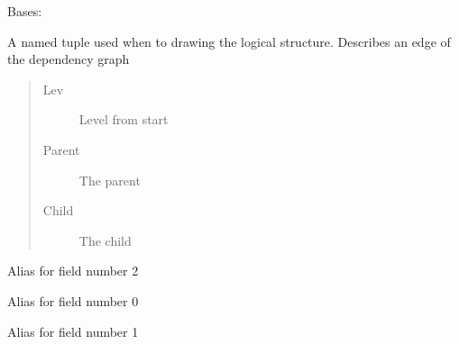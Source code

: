 \documentclass[letterpaper,10pt,english]{sphinxmanual}
\begin{document}
\begin{fulllineitems}
\label{\detokenize{core/modelclass:modelclass.node}}
\pysigstartsignatures
{}
\pysigstopsignatures
\sphinxAtStartPar
Bases: 

\sphinxAtStartPar
A named tuple used when to drawing the logical structure. Describes an edge of the dependency graph
\begin{quote}\begin{description}
\item[{Lev}] \leavevmode
\sphinxAtStartPar
Level from start

\item[{Parent}] \leavevmode
\sphinxAtStartPar
The parent

\item[{Child}] \leavevmode
\sphinxAtStartPar
The child

\end{description}\end{quote}

\begin{fulllineitems}
\label{\detokenize{core/modelclass:modelclass.node.child}}
\pysigstartsignatures
{}
\pysigstopsignatures
\sphinxAtStartPar
Alias for field number 2

\end{fulllineitems}


\begin{fulllineitems}
\label{\detokenize{core/modelclass:modelclass.node.lev}}
\pysigstartsignatures
{}
\pysigstopsignatures
\sphinxAtStartPar
Alias for field number 0

\end{fulllineitems}


\begin{fulllineitems}
\label{\detokenize{core/modelclass:modelclass.node.parent}}
\pysigstartsignatures
{}
\pysigstopsignatures
\sphinxAtStartPar
Alias for field number 1

\end{fulllineitems}


\end{fulllineitems}
\end{document}
